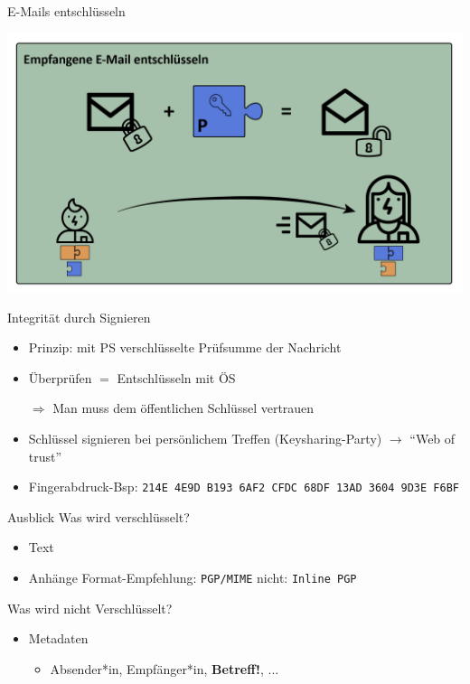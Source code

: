 \documentclass{beamer}
\begin{document}
\begin{frame}[label=lk1]{E-Mails entschlüsseln}
  \begin{center}
  \includegraphics[width=.9\textwidth]{img-src/pgp_dec.png}
  \end{center}
\end{frame}

  
\begin{frame}{Integrität durch Signieren}
  
  \begin{itemize}
   \item Prinzip: mit PS verschlüsselte Prüfsumme der Nachricht
   \item Überprüfen $=$ Entschlüsseln mit ÖS
   \item[$\Rightarrow$] Man muss dem öffentlichen Schlüssel vertrauen\\[2mm]
   
   \pause
   
   \item Schlüssel signieren bei persönlichem Treffen (Keysharing-Party) $\rightarrow$ "`Web of trust"'
   \item Fingerabdruck-Bsp: {\tiny \texttt{214E 4E9D B193 6AF2 CFDC 68DF 13AD 3604 9D3E F6BF}}
  \end{itemize}

\end{frame}


\begin{frame}[label=bg3a]{Ausblick}
Was wird verschlüsselt?
\begin{itemize}
\item Text
\item Anhänge {\tiny Format-Empfehlung: \texttt{PGP/MIME} \quad nicht: \texttt{Inline PGP}}
\item[]
\end{itemize}
Was wird nicht Verschlüsselt?
\begin{itemize}
 \item Metadaten
 \begin{itemize}
  \item Absender*in, Empfänger*in, \textbf{Betreff!}, ...
  \item[]
 \end{itemize}
\end{itemize}
\end{frame}
\end{document}
